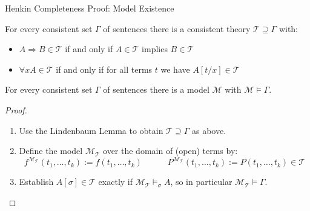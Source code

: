 \documentclass[xcolor=dvipsnames,aspectratio=169,handout]{beamer}
\renewcommand{\to}{\Rightarrow}
\newcommand{\TT}{\mathcal{T}}
\newcommand{\MM}{\mathcal{M}}
\begin{document}
\begin{frame}{Henkin Completeness Proof: Model Existence}
	\begin{lemma}[Lindenbaum]
		For every consistent set $\Gamma$ of sentences there is a consistent theory $\TT\supseteq \Gamma$ with:
		\begin{itemize}
			\item
			$A\to B\in \TT$ if and only if $A\in \TT$ implies $B\in \TT$
			\item
			$\forall x A\in \TT$ if and only if for all terms $t$ we have $A[t/x]\in \TT$
		\end{itemize}
	\end{lemma}
	
	\pause
	\begin{theorem}
		For every consistent set $\Gamma$ of sentences there is a model $\MM$ with $\MM\vDash \Gamma$.
	\end{theorem}
	\pause
	\vspace{-0.2cm}
	\begin{proof}
		\begin{enumerate}
			\pause
			\item
			Use the Lindenbaum Lemma to obtain $\TT\supseteq \Gamma$ as above.
			\pause
			\item
			Define the model $\MM_\TT$ over the domain of (open) terms by:
			$$f^{\MM_\TT}(t_1,\dots ,t_k):=f(t_1,\dots ,t_k)
			\hspace{3em}
			P^{\MM_\TT}(t_1,\dots ,t_k):=P(t_1,\dots ,t_k)\in \TT
			$$
			\item
			\pause
			Establish $A[\sigma]\in \TT$ exactly if $\MM_\TT\vDash_\sigma A$, so in particular $\MM_\TT\vDash \Gamma$.
			\qedhere
		\end{enumerate}
	\end{proof}
\end{frame}
\end{document}
